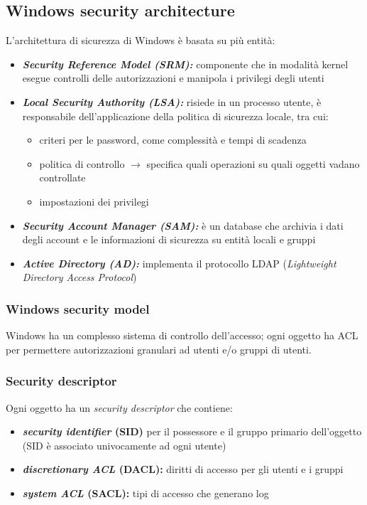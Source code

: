 \documentclass{report}
\begin{document}
\subsection{Windows security architecture}
L'architettura di sicurezza di Windows è basata su più entità:
\begin{itemize}
    \item \textbf{\textit{Security Reference Model (SRM):}} componente che in modalità kernel esegue 
    controlli delle autorizzazioni e manipola i privilegi degli utenti
    \item \textbf{\textit{Local Security Authority (LSA):}} risiede in un processo utente, è responsabile 
    dell'applicazione della politica di sicurezza locale, tra cui:
    \begin{itemize}
        \item criteri per le password, come complessità e tempi di scadenza 
        \item politica di controllo $\rightarrow$ specifica quali operazioni su quali oggetti vadano controllate 
        \item impostazioni dei privilegi
    \end{itemize}
    \item \textbf{\textit{Security Account Manager (SAM):}} è un database che archivia i dati degli account e le 
    informazioni di sicurezza su entità locali e gruppi
    \item \textbf{\textit{Active Directory (AD):}} implementa il protocollo LDAP (\textit{Lightweight Directory Access Protocol})
\end{itemize}

\subsubsection{Windows security model}
Windows ha un complesso sistema di controllo dell'accesso; ogni oggetto ha ACL per permettere autorizzazioni 
granulari ad utenti e/o gruppi di utenti.

\subsubsection{Security descriptor}
Ogni oggetto ha un \textit{security descriptor} che contiene:
\begin{itemize}
    \item \textbf{\textit{security identifier} (SID)} per il possessore e il gruppo primario dell'oggetto (SID è 
    associato univocamente ad ogni utente) 
    \item \textbf{\textit{discretionary ACL} (DACL):} diritti di accesso per gli utenti e i gruppi
    \item \textbf{\textit{system ACL} (SACL):} tipi di accesso che generano log
\end{itemize}
\end{document}
